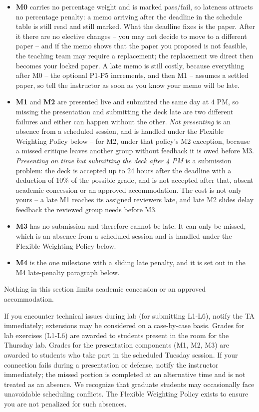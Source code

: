 \documentclass[
]{article}
\providecommand{\tightlist}{%
  \setlength{\itemsep}{0pt}\setlength{\parskip}{0pt}}
\begin{document}
\begin{itemize}
\tightlist
\item
  \textbf{M0} carries no percentage weight and is marked pass/fail, so
  lateness attracts no percentage penalty: a memo arriving after the
  deadline in the schedule table is still read and still marked. What
  the deadline fixes is the paper. After it there are no elective
  changes -- you may not decide to move to a different paper -- and if
  the memo shows that the paper you proposed is not feasible, the
  teaching team may require a replacement; the replacement we direct
  then becomes your locked paper. A late memo is still costly, because
  everything after M0 -- the optional P1-P5 increments, and then M1 --
  assumes a settled paper, so tell the instructor as soon as you know
  your memo will be late.
\item
  \textbf{M1} and \textbf{M2} are presented live and submitted the same
  day at 4 PM, so missing the presentation and submitting the deck late
  are two different failures and either can happen without the other.
  \emph{Not presenting} is an absence from a scheduled session, and is
  handled under the Flexible Weighting Policy below -- for M2, under
  that policy's M2 exception, because a missed critique leaves another
  group without feedback it is owed before M3. \emph{Presenting on time
  but submitting the deck after 4 PM} is a submission problem: the deck
  is accepted up to 24 hours after the deadline with a deduction of 10\%
  of the possible grade, and is not accepted after that, absent academic
  concession or an approved accommodation. The cost is not only yours --
  a late M1 reaches its assigned reviewers late, and late M2 slides
  delay feedback the reviewed group needs before M3.
\item
  \textbf{M3} has no submission and therefore cannot be late. It can
  only be missed, which is an absence from a scheduled session and is
  handled under the Flexible Weighting Policy below.
\item
  \textbf{M4} is the one milestone with a sliding late penalty, and it
  is set out in the M4 late-penalty paragraph below.
\end{itemize}

Nothing in this section limits academic concession or an approved
accommodation.

If you encounter technical issues during lab (for submitting L1-L6),
notify the TA immediately; extensions may be considered on a
case-by-case basis. Grades for lab exercises (L1-L6) are awarded to
students present in the room for the Thursday lab. Grades for the
presentation components (M1, M2, M3) are awarded to students who take
part in the scheduled Tuesday session. If your connection fails during a
presentation or defense, notify the instructor immediately; the missed
portion is completed at an alternative time and is not treated as an
absence. We recognize that graduate students may occasionally face
unavoidable scheduling conflicts. The Flexible Weighting Policy exists
to ensure you are not penalized for such absences.
\end{document}
